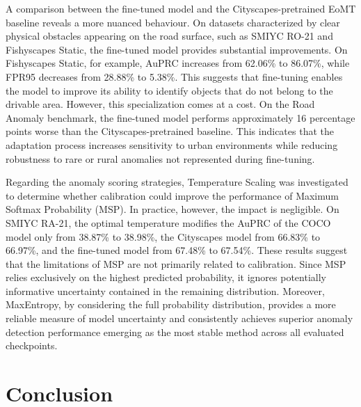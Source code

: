 \documentclass[10pt,twocolumn,letterpaper]{article}
\begin{document}
A comparison between the fine-tuned model and the Cityscapes-pretrained EoMT baseline reveals a more nuanced behaviour. On datasets characterized by clear physical obstacles appearing on the road surface, such as SMIYC RO-21 and Fishyscapes Static, the fine-tuned model provides substantial improvements. On Fishyscapes Static, for example, AuPRC increases from 62.06\% to 86.07\%, while FPR95 decreases from 28.88\% to 5.38\%. This suggests that fine-tuning enables the model to improve its ability to identify objects that do not belong to the drivable area. However, this specialization comes at a cost. On the Road Anomaly benchmark, the fine-tuned model performs approximately 16 percentage points worse than the Cityscapes-pretrained baseline. This indicates that the adaptation process increases sensitivity to urban environments while reducing robustness to rare or rural anomalies not represented during fine-tuning.

Regarding the anomaly scoring strategies, Temperature Scaling was investigated to determine whether calibration could improve the performance of Maximum Softmax Probability (MSP). In practice, however, the impact is negligible. On SMIYC RA-21, the optimal temperature modifies the AuPRC of the COCO model only from 38.87\% to 38.98\%, the Cityscapes model from 66.83\% to 66.97\%, and the fine-tuned model from 67.48\% to 67.54\%. These results suggest that the limitations of MSP are not primarily related to calibration. Since MSP relies exclusively on the highest predicted probability, it ignores potentially informative uncertainty contained in the remaining distribution. Moreover, MaxEntropy, by considering the full probability distribution, provides a more reliable measure of model uncertainty and consistently achieves superior anomaly detection performance emerging as the most stable method across all evaluated checkpoints.

\section{Conclusion}
\end{document}
